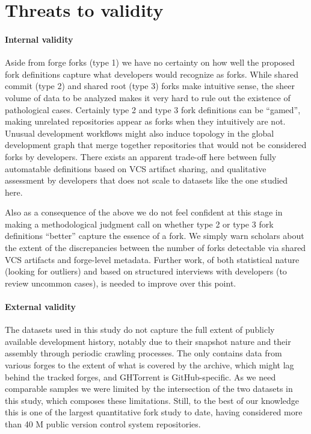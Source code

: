 \section{Threats to validity}
\label{sec:forks-threats}

\paragraph{Internal validity}
Aside from forge forks (type 1) we have no certainty on how well the proposed
fork definitions capture what developers would recognize as forks. While shared
commit (type 2) and shared root (type 3) forks make intuitive sense, the sheer
volume of data to be analyzed makes it very hard to rule out the existence of
pathological cases. Certainly type 2 and type 3 fork definitions can be
``gamed'', making unrelated repositories appear as forks when they intuitively
are not. Unusual development workflows might also induce topology in the global
development graph that merge together repositories that would not be considered
forks by developers. There exists an apparent trade-off here between fully
automatable definitions based on VCS artifact sharing, and qualitative
assessment by developers that does not scale to datasets like the one studied
here.

Also as a consequence of the above we do not feel confident at this stage in
making a methodological judgment call on whether type 2 or type 3 fork
definitions ``better'' capture the essence of a fork. We simply warn scholars
about the extent of the discrepancies between the number of forks detectable
via shared VCS artifacts and forge-level metadata. Further work, of both
statistical nature (looking for outliers) and based on structured interviews
with developers (to review uncommon cases), is needed to improve over this
point.

\paragraph{External validity}
The datasets used in this study do not capture the full extent of publicly
available development history, notably due to their snapshot nature and their
assembly through periodic crawling processes. The \SWHGD{} only contains data
from various forges to the extent of what is covered by the \SWH{} archive,
which might lag behind the tracked forges, and GHTorrent is GitHub-specific. As
we need comparable samples we were limited by the intersection of the two
datasets in this study, which composes these limitations. Still, to the best of
our knowledge this is one of the largest quantitative fork study to date,
having considered more than 40 M public version control system repositories.

